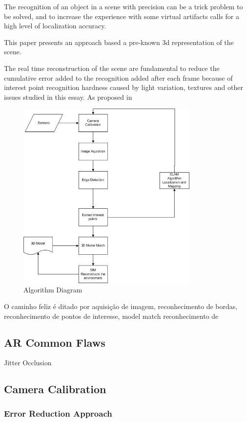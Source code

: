 The recognition of an object in a scene with precision can be a trick problem to be solved, and to increase the experience with some virtual artifacts calls for a high level of localization accuracy.

This paper presents an approach based a pre-known 3d representation of the scene.

The real time reconstruction of the scene are fundamental to reduce the cumulative error added to the recognition added after each frame because of interest point recognition hardness caused by light variation, textures and other issues studied in this essay.
As proposed in \cite{ISMAR2012}

\begin{figure}[ht!]
\centering
\includegraphics[width=90mm]{images/algorithm.jpg}
\caption{Algorithm Diagram}
\label{algorithm}
\end{figure}


O caminho feliz é ditado por aquisição de imagem, reconhecimento de bordas, reconhecimento de pontos de interesse, model match reconhecimento de 



\subsection{AR Common Flaws}

Jitter
Occlusion

\subsection{Camera Calibration}

\subsubsection{Error Reduction Approach}

